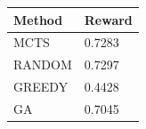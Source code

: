 \begin{tabular}{ll}
\hline
Method & Reward \\
\hline
  MCTS & 0.7283 \\
  RANDOM & 0.7297 \\
  GREEDY & 0.4428 \\
  GA & 0.7045 \\
\hline
\end{tabular}
